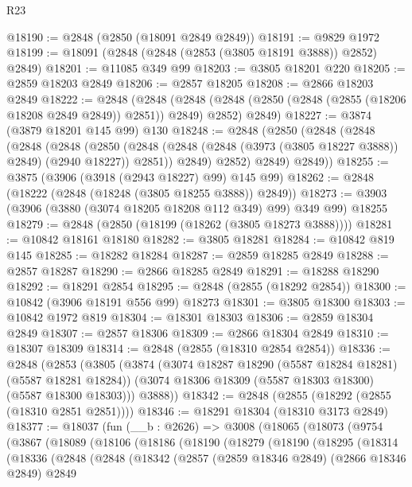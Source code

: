 \begin{lexlean}{R23}
\begin{coremodule}
@18190 := @2848 (@2850 (@18091 @2849 @2849))
@18191 := @9829 @1972
@18199 := @18091 (@2848 (@2848 (@2853 (@3805 @18191 @3888)) @2852) @2849)
@18201 := @11085 @349 @99
@18203 := @3805 @18201 @220
@18205 := @2859 @18203 @2849
@18206 := @2857 @18205
@18208 := @2866 @18203 @2849
@18222 := @2848
    (@2848
      (@2848 (@2848 (@2850 (@2848 (@2855 (@18206 @18208 @2849 @2849)) @2851)) @2849) @2852)
      @2849)
@18227 := @3874 (@3879 @18201 @145 @99) @130
@18248 := @2848
    (@2850
      (@2848
        (@2848
          (@2848
            (@2848
              (@2850
                (@2848 (@2848 (@2848 (@3973 (@3805 @18227 @3888)) @2849) (@2940 @18227)) @2851))
              @2849)
            @2852)
          @2849)
        @2849))
@18255 := @3875 (@3906 (@3918 (@2943 @18227) @99) @145 @99)
@18262 := @2848 (@18222 (@2848 (@18248 (@3805 @18255 @3888)) @2849))
@18273 := @3903 (@3906 (@3880 (@3074 @18205 @18208 @112 @349) @99) @349 @99) @18255
@18279 := @2848 (@2850 (@18199 (@18262 (@3805 @18273 @3888))))
@18281 := @10842 @18161 @18180
@18282 := @3805 @18281
@18284 := @10842 @819 @145
@18285 := @18282 @18284
@18287 := @2859 @18285 @2849
@18288 := @2857 @18287
@18290 := @2866 @18285 @2849
@18291 := @18288 @18290
@18292 := @18291 @2854
@18295 := @2848 (@2855 (@18292 @2854))
@18300 := @10842 (@3906 @18191 @556 @99) @18273
@18301 := @3805 @18300
@18303 := @10842 @1972 @819
@18304 := @18301 @18303
@18306 := @2859 @18304 @2849
@18307 := @2857 @18306
@18309 := @2866 @18304 @2849
@18310 := @18307 @18309
@18314 := @2848 (@2855 (@18310 @2854 @2854))
@18336 := @2848
    (@2853
      (@3805
        (@3874
          (@3074 @18287 @18290 (@5587 @18284 @18281) (@5587 @18281 @18284))
          (@3074 @18306 @18309 (@5587 @18303 @18300) (@5587 @18300 @18303)))
        @3888))
@18342 := @2848 (@2855 (@18292 (@2855 (@18310 @2851 @2851))))
@18346 := @18291 @18304 (@18310 @3173 @2849)
@18377 := @18037
    (fun (__b : @2626) =>
    @3008
      (@18065
        (@18073
          (@9754
            (@3867
              (@18089
                (@18106
                  (@18186
                    (@18190
                      (@18279
                        (@18190
                          (@18295
                            (@18314
                              (@18336
                                (@2848
                                  (@2848
                                    (@18342
                                      (@2857
                                        (@2859 @18346 @2849)
                                        (@2866 @18346 @2849)
                                        @2849

\end{coremodule}
\end{lexlean}

